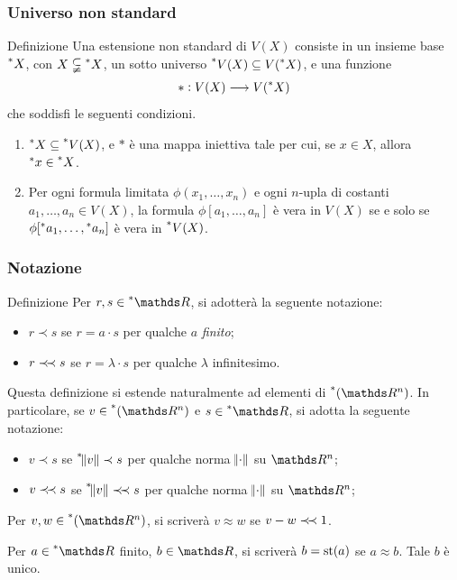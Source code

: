 \documentclass{beamer}
\newenvironment{definizioneb}{\begin{block}{Definizione}}{\end{block}}
\begin{document}
\begin{frame}
    \frametitle{Universo non standard}

    \begin{definizioneb}
        Una estensione non standard di $ V(X) $ consiste in un insieme base $ \prescript{*}{}{X} $, con $ X \subsetneqq \prescript{*}{}{X} $, un sotto universo $ \prescript{*}{}{V(X)} \subseteq V(\prescript{*}{}{X}) $, e una funzione \begin{equation*}
            *: V(X) \longrightarrow V(\prescript{*}{}{X})
        \end{equation*}che soddisfi le seguenti condizioni. \begin{enumerate}
            \item[(I)] $ \prescript{*}{}{X} \subseteq \prescript{*}{}{V(X)} $, e $ * $ è una mappa iniettiva tale per cui, se $ x \in X $, allora $ \prescript{*}{}{x} \in \prescript{*}{}{X} $. 
            \item[(II)] Per ogni formula limitata $ \phi(x_1,\dots,x_{n} ) $ e ogni $ n $-upla di costanti $ a_1,\dots,a_{n} \in V(X)  $, la formula $ \phi[a_1,\dots,a_{n} ] $ è vera in $ V(X) $ se e solo se $ \phi[\prescript{*}{}{a_1},\dots,\prescript{*}{}{a_{n} }] $ è vera in $ \prescript{*}{}{V(X)} $.
        \end{enumerate}
    \end{definizioneb}

\end{frame}


\begin{frame}
    \frametitle{Notazione}

    \begin{definizioneb}
        Per $ r, s \in \starR $, si adotterà la seguente notazione: \begin{itemize}
            \item $ r \prec s $ se $ r = a \cdot s $ per qualche $ a $ \emph{finito};
            \item $ r \mathrel{\prec\! \prec} s $ se $ r = \lambda \cdot s $ per qualche $ \lambda $ infinitesimo.
        \end{itemize}
    \end{definizioneb}

    Questa definizione si estende naturalmente ad elementi di $ \nonstandard{(\R^n)} $. In particolare, se $ v \in \nonstandard{(\R^n)} $ e $ s \in \starR $, si adotta la seguente notazione: \begin{itemize}
        \item $ v \prec s $ se $ \prescript{*}{}{\norm{v}} \prec s $ per qualche norma $ \norm{ \cdot } $ su $ \R^{n} $;
        \item $ v \mathrel{\prec\! \prec} s $ se $ \prescript{*}{}{\norm{v}} \mathrel{\prec\! \prec} s $ per qualche norma $ \norm{ \cdot } $ su $ \R^{n} $;
    \end{itemize}

    Per $ v, w \in \nonstandard{(\R^n)} $, si scriverà $ v\approx w $ se $ v-w \mathrel{\prec\! \prec} 1 $.

    Per $ a \in \starR $ finito, $ b \in \R $, si scriverà $ b = \operatorname{st}(a) $ se $ a\approx b $. Tale $ b $ è unico.

\end{frame}
\end{document}
